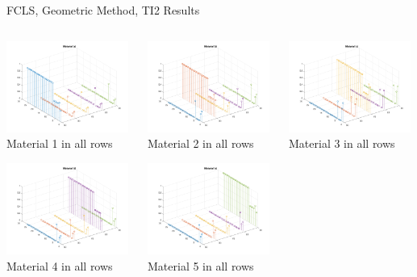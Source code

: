 \documentclass{beamer}
\begin{document}
\begin{frame}{FCLS, Geometric Method, TI2 Results}
\begin{columns}
    \begin{column}{0.33\textwidth}
        \includegraphics[width=4cm,center]{gfcls_ti2_material_stem_1}
        \\ Material 1 in all rows
        \centering

        \includegraphics[width=4cm,center]{gfcls_ti2_material_stem_4}
        \\ Material 4 in all rows
        \centering
    \end{column}
    \begin{column}{0.33\textwidth}
        \includegraphics[width=4cm,center]{gfcls_ti2_material_stem_2}
        \\ Material 2 in all rows
        \centering

        \includegraphics[width=4cm,center]{gfcls_ti2_material_stem_5}
        \\ Material 5 in all rows
        \centering
    \end{column}
    \begin{column}{0.33\textwidth}
        \includegraphics[width=4cm,center]{gfcls_ti2_material_stem_3}
        \\ Material 3 in all rows
        \centering


\end{column}
\end{columns}
\end{frame}
\end{document}
